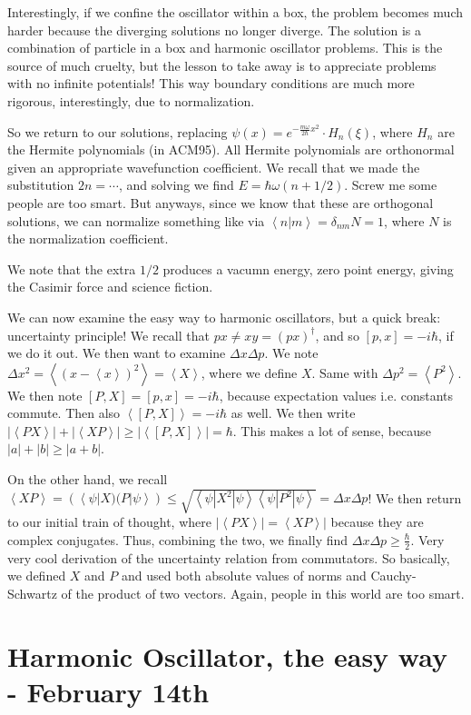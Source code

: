 \documentclass{report}
\begin{document}
Interestingly, if we confine the oscillator within a box, the problem becomes much harder because the diverging solutions no longer diverge. The solution is a combination of particle in a box and harmonic oscillator problems. This is the source of much cruelty, but the lesson to take away is to appreciate problems with no infinite potentials! This way boundary conditions are much more rigorous, interestingly, due to normalization.

So we return to our solutions, replacing $\psi(x) = e^{-\frac{m\omega}{2\hbar}x^2}\cdot H_n(\xi)$, where $H_n$ are the Hermite polynomials (in ACM95). All Hermite polynomials are orthonormal given an appropriate wavefunction coefficient. We recall that we made the substitution $2n = \cdots$, and solving we find $E = \hbar \omega(n+1/2)$. Screw me some people are too smart. But anyways, since we know that these are orthogonal solutions, we can normalize something like via $\left<n|m\right> = \delta_{nm}N = 1$, where $N$ is the normalization coefficient.

We note that the extra $1/2$ produces a vacumn energy, zero point energy, giving the Casimir force and science fiction. 

We can now examine the easy way to harmonic oscillators, but a quick break: uncertainty principle! We recall that $px \neq xy = (px)^\dagger$, and so $[p,x] = -i\hbar$, if we do it out. We then want to examine $\Delta x \Delta p$. We note $\Delta x^2 = \left<(x-\left<x\right>)^2\right> = \left<X\right>$, where we define $X$. Same with $\Delta p^2 = \left<P^2\right>$. We then note $[P,X] = [p,x] = -i\hbar$, because expectation values i.e. constants commute. Then also $\left<[P,X]\right> = -i\hbar$ as well. We then write $|\left<PX\right>| + |\left<XP\right>| \geq |\left<[P,X]\right>| = \hbar$. This makes a lot of sense, because $|a| + |b| \geq |a+b|$. 

On the other hand, we recall $\left<XP\right> = (\left<\psi|X)(P|\psi\right>) \leq \sqrt{\left<\psi|X^2|\psi\right>\left<\psi|P^2|\psi\right>} = \Delta x\Delta p$! We then return to our initial train of thought, where $|\left<PX\right>| = \left<XP\right>|$ because they are complex conjugates. Thus, combining the two, we finally find $\Delta x\Delta p \geq \frac{\hbar}{2}$. Very very cool derivation of the uncertainty relation from commutators. So basically, we defined $X$ and $P$ and used both absolute values of norms and Cauchy-Schwartz of the product of two vectors. Again, people in this world are too smart. 

\chapter{Harmonic Oscillator, the easy way - February 14th}
\end{document}
